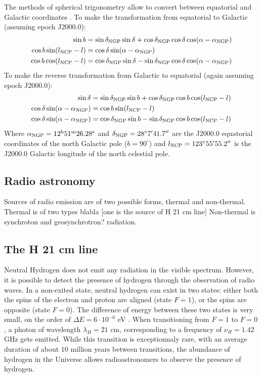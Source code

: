 The methods of spherical trigonometry allow to convert between equatorial and Galactic coordinates \Cite{carroll_introduction_2007}. To make the transformation from equatorial to Galactic (assuming epoch J2000.0):
\begin{align}
    \sin b &= \sin \delta_{\text{NGP}} \sin \delta + \cos \delta_{\text{NGP}} \cos \delta \cos (\alpha - \alpha_{\text{NGP}}) \\
    \cos b \sin(l_{\text{NCP}} - l) &= \cos \delta \sin(\alpha - \alpha_{\text{NGP}}) \\
    \cos b \cos (l_{\text{NCP}} - l) &= \cos \delta_{\text{NGP}} \sin \delta - \sin \delta_{\text{NGP}} \cos \delta \cos(\alpha - \alpha_{\text{NGP}})
\end{align}
To make the reverse transformation from Galactic to equatorial (again assuming epoch J2000.0):
\begin{align}
    \sin \delta &= \sin \delta_{\text{NGP}} \sin b + \cos \delta_{\text{NGP}} \cos b \cos (l_{\text{NCP}} - l) \\
    \cos \delta \sin(\alpha - \alpha_{\text{NGP}}) &= \cos b \sin(l_{\text{NCP}} - l) \\
    \cos \delta \sin(\alpha - \alpha_{\text{NGP}}) &= \cos \delta_{\text{NGP}} \sin b - \sin \delta_{\text{NGP}} \cos b \cos (l_{\text{NCP}} - l)
\end{align}
Where $\alpha_{\text{NGP}} = 12^{\text{h}} 51^{\text{m}} 26.28^{\text{s}}$ and $\delta_{\text{NGP}} = 28^{\circ}7' 41.7''$ are the J2000.0 equatorial coordinates of the north Galactic pole ($b = 90^{\circ}$) and $l_{\text{NCP}} = 123^{\circ} 55' 55.2''$ is the J2000.0 Galactic longitude of the north celestial pole.

\subsection{Radio astronomy }
Sources of radio emission are of two possible forms, thermal and non-thermal.
Thermal is of two types blabla [one is the source of H 21 cm line]
Non-thermal is synchroton and geosynchrotron? radiation.

\subsection{The H 21 cm line}
Neutral Hydrogen does not emit any radiation in the visible spectrum.
However, it is possible to detect the presence of hydrogen through the observation of radio waves.
In a non-exited state, neutral hydrogen can exist in two states: either both the spins of the electron and proton are aligned (state $F=1$), or the spins are opposite (state $F=0$).
The difference of energy between these two states is very small, on the order of $\Delta E = 6 \cdot 10^{-6}$ \si{\electronvolt} \cite{frederic_courbin_introduction_nodate}.
When transitioning from $F=1$ to $F=0$, a photon of wavelength $\lambda_H = 21$ cm, corresponding to a frequency of $\nu_H = 1.42$ GHz gets emitted.
While this transition is exceptionnaly rare, with an average duration of about $10$ million years between transitions, the abundance of hydrogen in the Universe allows radioastronomers to observe the presence of hydrogen.

